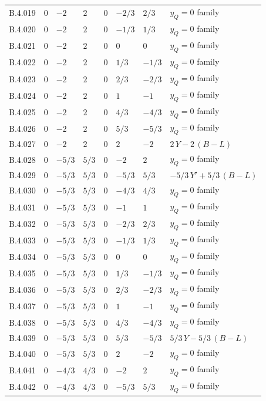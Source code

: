 {\begin{longtable}{@{}lllllll>{\raggedright\arraybackslash}p{5.6cm}@{}}
B.4.019 & $0$ & $-2$ & $2$ & $0$ & $-2/3$ & $2/3$ & $y_Q=0$ family \\
B.4.020 & $0$ & $-2$ & $2$ & $0$ & $-1/3$ & $1/3$ & $y_Q=0$ family \\
B.4.021 & $0$ & $-2$ & $2$ & $0$ & $0$ & $0$ & $y_Q=0$ family \\
B.4.022 & $0$ & $-2$ & $2$ & $0$ & $1/3$ & $-1/3$ & $y_Q=0$ family \\
B.4.023 & $0$ & $-2$ & $2$ & $0$ & $2/3$ & $-2/3$ & $y_Q=0$ family \\
B.4.024 & $0$ & $-2$ & $2$ & $0$ & $1$ & $-1$ & $y_Q=0$ family \\
B.4.025 & $0$ & $-2$ & $2$ & $0$ & $4/3$ & $-4/3$ & $y_Q=0$ family \\
B.4.026 & $0$ & $-2$ & $2$ & $0$ & $5/3$ & $-5/3$ & $y_Q=0$ family \\
B.4.027 & $0$ & $-2$ & $2$ & $0$ & $2$ & $-2$ & $2\,Y-2\,(B{-}L)$ \\
B.4.028 & $0$ & $-5/3$ & $5/3$ & $0$ & $-2$ & $2$ & $y_Q=0$ family \\
B.4.029 & $0$ & $-5/3$ & $5/3$ & $0$ & $-5/3$ & $5/3$ & $-5/3\,Y'+5/3\,(B{-}L)$ \\
B.4.030 & $0$ & $-5/3$ & $5/3$ & $0$ & $-4/3$ & $4/3$ & $y_Q=0$ family \\
B.4.031 & $0$ & $-5/3$ & $5/3$ & $0$ & $-1$ & $1$ & $y_Q=0$ family \\
B.4.032 & $0$ & $-5/3$ & $5/3$ & $0$ & $-2/3$ & $2/3$ & $y_Q=0$ family \\
B.4.033 & $0$ & $-5/3$ & $5/3$ & $0$ & $-1/3$ & $1/3$ & $y_Q=0$ family \\
B.4.034 & $0$ & $-5/3$ & $5/3$ & $0$ & $0$ & $0$ & $y_Q=0$ family \\
B.4.035 & $0$ & $-5/3$ & $5/3$ & $0$ & $1/3$ & $-1/3$ & $y_Q=0$ family \\
B.4.036 & $0$ & $-5/3$ & $5/3$ & $0$ & $2/3$ & $-2/3$ & $y_Q=0$ family \\
B.4.037 & $0$ & $-5/3$ & $5/3$ & $0$ & $1$ & $-1$ & $y_Q=0$ family \\
B.4.038 & $0$ & $-5/3$ & $5/3$ & $0$ & $4/3$ & $-4/3$ & $y_Q=0$ family \\
B.4.039 & $0$ & $-5/3$ & $5/3$ & $0$ & $5/3$ & $-5/3$ & $5/3\,Y-5/3\,(B{-}L)$ \\
B.4.040 & $0$ & $-5/3$ & $5/3$ & $0$ & $2$ & $-2$ & $y_Q=0$ family \\
B.4.041 & $0$ & $-4/3$ & $4/3$ & $0$ & $-2$ & $2$ & $y_Q=0$ family \\
B.4.042 & $0$ & $-4/3$ & $4/3$ & $0$ & $-5/3$ & $5/3$ & $y_Q=0$ family \\

\end{longtable}}
